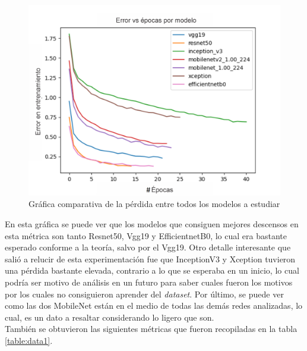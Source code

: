\begin{figure}[h!]
\includegraphics[width=1\textwidth]{images/loss1.png}
\centering
\caption{Gráfica comparativa de la pérdida entre todos los modelos a estudiar}
\label{fig:losses1}
\end{figure}


En esta gráfica se puede ver que los modelos que consiguen mejores descensos en esta 
métrica son tanto Resnet50, Vgg19 y EfficientnetB0, lo cual era bastante esperado conforme 
a la teoría, salvo por el Vgg19. Otro detalle interesante que salió a relucir de esta 
experimentación fue que InceptionV3 y Xception tuvieron una pérdida bastante elevada, 
contrario a lo que se esperaba en un inicio, lo cual podría ser motivo de análisis en un 
futuro para saber cuales fueron los motivos por los cuales no consiguieron aprender del 
\textit{dataset}. Por último, se puede ver como las dos MobileNet están en el medio de 
todas las demás redes analizadas, lo cual, es un dato a resaltar considerando lo ligero que 
son. \\

También se obtuvieron las siguientes métricas que fueron recopiladas en la tabla \ref{table:data1}.

